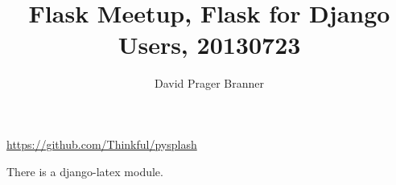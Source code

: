\documentclass[10pt,fleqn,asymmetric]{article}	%
\title{\vspace{-1in}Flask Meetup, Flask for Django Users, 20130723}
\author{David Prager Branner}
\begin{document}
\pagestyle{fancy}


\maketitle
\thispagestyle{empty}			%
\renewcommand{\headrulewidth}{0.2pt}
\fancyhead[LE,RO]{\fontsize{9}{11}\selectfont\thepage}
\fancyfoot{}

\begin{multicols}{3}
\setlength\columnseprule{.2pt}
\tableofcontents
\end{multicols}

\section{}


\url{https://github.com/Thinkful/pysplash}

There is a django-latex module.
\end{document}
